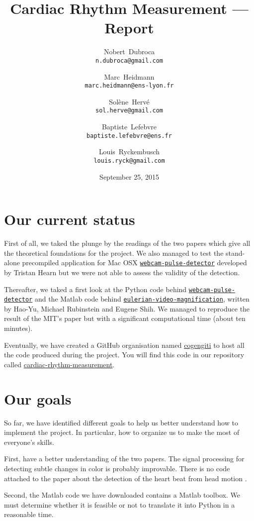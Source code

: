\documentclass[a4paper]{article}
\title{Cardiac Rhythm Measurement --- Report}
\author{Nobert~Dubroca \\ \small{\texttt{n.dubroca@gmail.com}}
  \and Marc~Heidmann \\ \small{\texttt{marc.heidmann@ens-lyon.fr}}
  \and Sol\`{e}ne~Herv\'{e} \\ \small{\texttt{sol.herve@gmail.com}}
  \and Baptiste~Lefebvre \\ \small{\texttt{baptiste.lefebvre@ens.fr}}
  \and Louis~Ryckembusch \\ \small{\texttt{louis.ryck@gmail.com}}}
\date{September 25, 2015}
\begin{document}
\maketitle


\section*{Our current status}

First of all, we taked the plunge by the readings of the two papers \cite{wu2012eulerian,balakrishnan2013detecting} which give all the theoretical foundations for the project. We also managed to test the stand-alone precompiled application for Mac OSX \href{https://github.com/thearn/webcam-pulse-detector}{\texttt{webcam-pulse-detector}} developed by Tristan Hearn but we were not able to assess the validity of the detection.

Thereafter, we taked a first look at the Python code behind \href{https://github.com/thearn/webcam-pulse-detector}{\texttt{webcam-pulse-detector}} and the Matlab code behind \href{http://people.csail.mit.edu/mrub/evm/#code}{\texttt{eulerian-video-magnification}}, written by Hao-Yu, Michael Rubinstein and Eugene Shih. We managed to reproduce the result of the MIT's paper \cite{wu2012eulerian} but with a significant computational time (about ten minutes).

Eventually, we have created a GitHub organisation named \href{https://github.com/cogengiti}{cogengiti} to host all the code produced during the project. You will find this code in our repository called \href{https://github.com/cogengiti/cardiac-rhythm-measurement}{cardiac-rhythm-measurement}.


\section*{Our goals}

So far, we have identified different goals to help us better understand how to implement the project. In particular, how to organize us to make the most of everyone's skills.

First, have a better understanding of the two papers. The signal processing for detecting subtle changes in color is probably improvable. There is no code attached to the paper about the detection of the heart beat from head motion \cite{balakrishnan2013detecting}.

Second, the Matlab code we have downloaded contains a Matlab toolbox. We must determine whether it is feasible or not to translate it into Python in a reasonable time.
\end{document}
